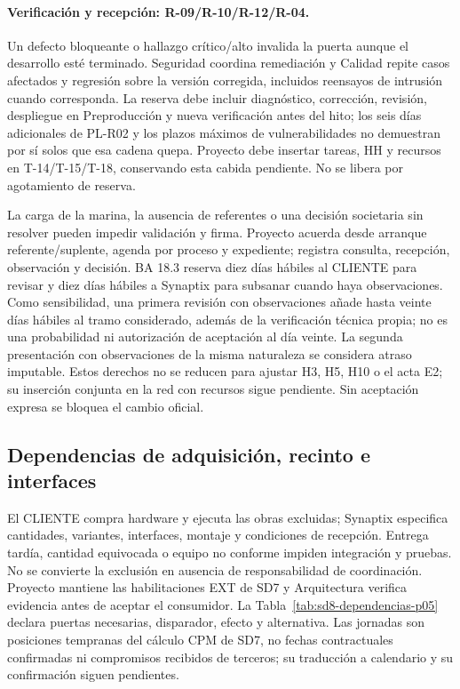 \paragraph{Verificación y recepción: R-09/R-10/R-12/R-04.}
Un defecto bloqueante o hallazgo crítico/alto invalida la puerta aunque el desarrollo esté terminado. Seguridad coordina remediación y Calidad repite casos afectados y regresión sobre la versión corregida, incluidos reensayos de intrusión cuando corresponda. La reserva debe incluir diagnóstico, corrección, revisión, despliegue en Preproducción y nueva verificación antes del hito; los seis días adicionales de PL-R02 y los plazos máximos de vulnerabilidades no demuestran por sí solos que esa cadena quepa. Proyecto debe insertar tareas, HH y recursos en T-14/T-15/T-18, conservando esta cabida pendiente. No se libera por agotamiento de reserva. \parencites[art.~17.3; p.~13]{sd8-ba}[cap.~20; pp.~34--35]{sd8-bt}

La carga de la marina, la ausencia de referentes o una decisión societaria sin resolver pueden impedir validación y firma. Proyecto acuerda desde arranque referente/suplente, agenda por proceso y expediente; registra consulta, recepción, observación y decisión. BA 18.3 reserva diez días hábiles al CLIENTE para revisar y diez días hábiles a Synaptix para subsanar cuando haya observaciones. Como sensibilidad, una primera revisión con observaciones añade hasta veinte días hábiles al tramo considerado, además de la verificación técnica propia; no es una probabilidad ni autorización de aceptación al día veinte. La segunda presentación con observaciones de la misma naturaleza se considera atraso imputable. Estos derechos no se reducen para ajustar H3, H5, H10 o el acta E2; su inserción conjunta en la red con recursos sigue pendiente. Sin aceptación expresa se bloquea el cambio oficial. \parencite[arts.~18 y 71--72; pp.~13--14, 37--38]{sd8-ba}

\subsection{Dependencias de adquisición, recinto e interfaces}\label{sec:sd8-dependencias-implantacion}
El CLIENTE compra hardware y ejecuta las obras excluidas; Synaptix especifica cantidades, variantes, interfaces, montaje y condiciones de recepción. Entrega tardía, cantidad equivocada o equipo no conforme impiden integración y pruebas. No se convierte la exclusión en ausencia de responsabilidad de coordinación. Proyecto mantiene las habilitaciones EXT de SD7 y Arquitectura verifica evidencia antes de aceptar el consumidor. La Tabla~\ref{tab:sd8-dependencias-p05} declara puertas necesarias, disparador, efecto y alternativa. Las jornadas son posiciones tempranas del cálculo CPM de SD7, no fechas contractuales confirmadas ni compromisos recibidos de terceros; su traducción a calendario y su confirmación siguen pendientes.

